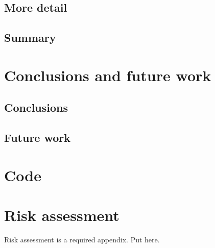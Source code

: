     \subsection{More detail}
    \subsection{Summary}
  \section{Conclusions and future work} %
    \subsection{Conclusions}
      \subsection{Future work}
    \printbibliography
  \begin{uomappendix} 
      \section{Code}
      \section{Risk assessment}
      Risk assessment is a required appendix. Put here.
  \end{uomappendix}
  
  